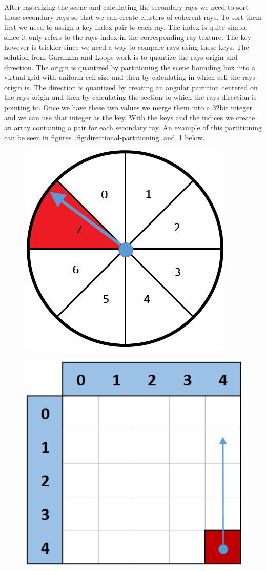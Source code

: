 \documentclass{llncs}
\begin{document}
After rasterizing the scene and calculating the secondary rays we need to sort those secondary rays so that we can create clusters of coherent rays. To sort them first we need to assign a key-index pair to each ray. The index is quite simple since it only refers to the rays index in the corresponding ray texture. The key however is trickier since we need a way to compare rays using these keys. The solution from Garanzha and Loops work \cite{GaranzhaLoop10} is to quantize the rays origin and direction. The origin is quantized by partitioning the scene bounding box into a virtual grid with uniform cell size and then by calculating in which cell the rays origin is. The direction is quantized by creating an angular partition centered on the rays origin and then by calculating the section to which the rays direction is pointing to. Once we have these two values we merge them into a 32bit integer and we can use that integer as the key. With the keys and the indices we create an array containing a pair for each secondary ray. An example of this partitioning can be seen in figures~\ref{fig:directional-partitioning} and~\ref{fig:spatial-partitioning} below.

\begin{figure}
\centering
\begin{minipage}{.5\textwidth}
  \centering
  \includegraphics[width=.45\linewidth]{images/figure 7.png}
  \label{fig:directional-partitioning}
\end{minipage}%
\begin{minipage}{.5\textwidth}
  \centering
  \includegraphics[width=.45\linewidth]{images/figure 8.png}
  \label{fig:spatial-partitioning}
\end{minipage}
\end{figure}
\end{document}
